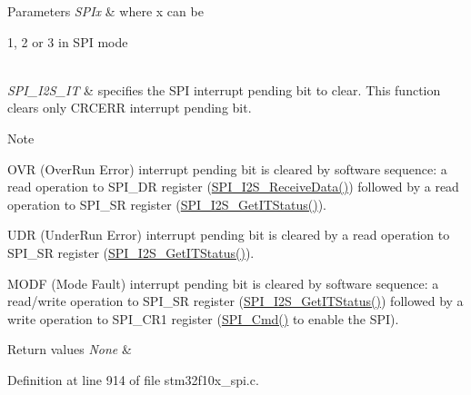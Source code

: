 \begin{DoxyParams}{Parameters}
{\em S\+P\+Ix} & where x can be
\begin{DoxyItemize}
\item 1, 2 or 3 in S\+PI mode 
\end{DoxyItemize}\\
\hline
{\em S\+P\+I\+\_\+\+I2\+S\+\_\+\+IT} & specifies the S\+PI interrupt pending bit to clear. This function clears only C\+R\+C\+E\+RR interrupt pending bit. \\
\hline
\end{DoxyParams}
\begin{DoxyNote}{Note}

\begin{DoxyItemize}
\item O\+VR (Over\+Run Error) interrupt pending bit is cleared by software sequence\+: a read operation to S\+P\+I\+\_\+\+DR register (\hyperlink{group___s_p_i___private___functions_gab77de76547f3bff403236b263b070a30}{S\+P\+I\+\_\+\+I2\+S\+\_\+\+Receive\+Data()}) followed by a read operation to S\+P\+I\+\_\+\+SR register (\hyperlink{group___s_p_i___private___functions_ga72decbc1cd79f8fad92a2204beca6bc5}{S\+P\+I\+\_\+\+I2\+S\+\_\+\+Get\+I\+T\+Status()}).
\item U\+DR (Under\+Run Error) interrupt pending bit is cleared by a read operation to S\+P\+I\+\_\+\+SR register (\hyperlink{group___s_p_i___private___functions_ga72decbc1cd79f8fad92a2204beca6bc5}{S\+P\+I\+\_\+\+I2\+S\+\_\+\+Get\+I\+T\+Status()}).
\item M\+O\+DF (Mode Fault) interrupt pending bit is cleared by software sequence\+: a read/write operation to S\+P\+I\+\_\+\+SR register (\hyperlink{group___s_p_i___private___functions_ga72decbc1cd79f8fad92a2204beca6bc5}{S\+P\+I\+\_\+\+I2\+S\+\_\+\+Get\+I\+T\+Status()}) followed by a write operation to S\+P\+I\+\_\+\+C\+R1 register (\hyperlink{group___s_p_i___private___functions_gaa31357879a65ee1ed7223f3b9114dcf3}{S\+P\+I\+\_\+\+Cmd()} to enable the S\+PI). 
\end{DoxyItemize}
\end{DoxyNote}

\begin{DoxyRetVals}{Return values}
{\em None} & \\
\hline
\end{DoxyRetVals}


Definition at line 914 of file stm32f10x\+\_\+spi.\+c.

\mbox{\label{group___s_p_i___private___functions_gabe36880945fa56785283a9c0092124cc}} 
